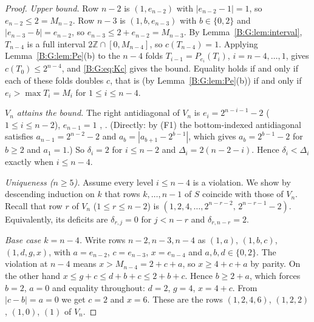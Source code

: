 \documentclass[11pt,a4paper]{article}
\theoremstyle{definition}
\theoremstyle{remark}
\numberwithin{equation}{section}
\begin{document}
\begin{proof}
\emph{Upper bound.} Row $n-2$ is $(1,e_{n-2})$ with $|e_{n-2}-1|=1$, so $e_{n-2}\le2=M_{n-2}$.
Row $n-3$ is $(1,b,e_{n-3})$ with $b\in\{0,2\}$ and $|e_{n-3}-b|=e_{n-2}$, so
$e_{n-3}\le2+e_{n-2}=M_{n-3}$. By Lemma~\ref{B:G:lem:interval}, $T_{n-4}$ is a full interval
$2\mathbb{Z}\cap[0,M_{n-4}]$, so $c(T_{n-4})=1$. Applying Lemma~\ref{B:G:lem:Pe}(b) to the $n-4$ folds
$T_{i-1}=P_{e_i}(T_i)$, $i=n-4,\dots,1$, gives $c(T_0)\le2^{n-4}$, and \eqref{B:G:eq:Kc} gives the
bound. Equality holds if and only if each of these folds doubles $c$, that is (by
Lemma~\ref{B:G:lem:Pe}(b)) if and only if $e_i>\max T_i=M_i$ for $1\le i\le n-4$.

\emph{$V_n$ attains the bound.} The right antidiagonal of $V_n$ is
$e_i=2^{n-i-1}-2$ ($1\le i\le n-2$), $e_{n-1}=1$ \cite[Lemma~33]{R003}, \cite{R021}. (Directly: by (F1) the bottom-indexed
antidiagonal satisfies $a_{n-1}=2^{n-2}-2$ and $a_b=|a_{b+1}-2^{b-1}|$, which gives $a_b=2^{b-1}-2$
for $b\ge2$ and $a_1=1$.) So $\delta_i=2$ for $i\le n-2$ and $\Delta_i=2(n-2-i)$. Hence
$\delta_i<\Delta_i$ exactly when $i\le n-4$.

\emph{Uniqueness ($n\ge5$).} Assume every level $i\le n-4$ is a violation. We show by descending
induction on $k$ that rows $k,\dots,n-1$ of $S$ coincide with those of $V_n$. Recall that row $r$ of
$V_n$ ($1\le r\le n-2$) is $(1,2,4,\dots,2^{n-r-2},\,2^{n-r-1}-2)$. Equivalently, its deficits are
$\delta_{r,j}=0$ for $j<n-r$ and $\delta_{r,n-r}=2$.

\emph{Base case $k=n-4$.} Write rows $n-2,n-3,n-4$ as $(1,a)$, $(1,b,c)$, $(1,d,g,x)$, with
$a=e_{n-2}$, $c=e_{n-3}$, $x=e_{n-4}$ and $a,b,d\in\{0,2\}$. The violation at $n-4$ means
$x>M_{n-4}=2+c+a$, so $x\ge4+c+a$ by parity. On the other hand
$x\le g+c\le d+b+c\le2+b+c$. Hence $b\ge2+a$, which forces $b=2$, $a=0$ and equality throughout:
$d=2$, $g=4$, $x=4+c$. From $|c-b|=a=0$ we get $c=2$ and $x=6$. These are the rows
$(1,2,4,6)$, $(1,2,2)$, $(1,0)$, $(1)$ of $V_n$.


\end{proof}
\end{document}
